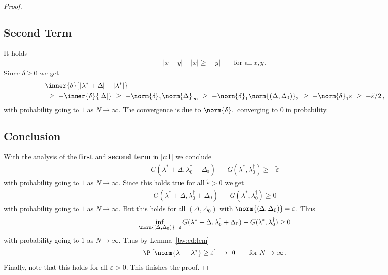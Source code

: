 \begin{proof}
\subsection*{Second Term}
It holds
\begin{gather*}
  |x+y|-|x|\ge
  -|y|
  \qquad
  \text{for all}\ 
  x,y
  \,.
\end{gather*}
Since
$\delta\ge 0$
we get
\begin{align*}
  &
     \inner
     {\delta}
     {
       |\lambda^*+\Delta|
       -
       |\lambda^*|
     }
     \\
     &
     \ 
     \ge
     \ 
     -
     \inner{\delta}
     {|\Delta|}
     \ 
     \ge
     \ 
     -
     \norm{\delta}_1
     \norm{\Delta}_\infty
     \ 
     \ge
     \ 
     -
     \norm{\delta}_1
     \norm{(\Delta,\Delta_0)}_2
     \ 
     \ge
     \ 
     -
     \norm{\delta}_1
     \varepsilon
     \ 
     \ge
     \ 
     -
     \tilde{\varepsilon}/2
     \,,
\end{align*}
with probability going to $1$ as $N\to \infty$.
The convergence is due to $\norm{\delta}_1$ converging to $0$ in probability.
\subsection*{Conclusion}
With the analysis of the \textbf{first} and \textbf{second term} in
\eqref{c:1} we conclude
\begin{gather}
  G
     (
     \lambda^*
      +
      \Delta
      ,
      \lambda^\dagger_0
      +
     \Delta_0
     )
     \ 
     -
     \ 
     G
     (
     \lambda^*,
      \lambda^\dagger_0
     )
     \ge
     -
     \tilde{\varepsilon}
\end{gather}
with probability going to $1$ as $N\to \infty$.
Since this holds true for all $\tilde{\varepsilon}>0$ we get
\begin{gather}
  G
     (
     \lambda^*
      +
      \Delta
      ,
      \lambda^\dagger_0
      +
     \Delta_0
     )
     \ 
     -
     \ 
     G
     (
     \lambda^*,
      \lambda^\dagger_0
     )
     \ge
     0
\end{gather}
with probability going to $1$ as $N\to \infty$.
But this holds for all 
$
(\Delta,\Delta_0)
$
with 
$
\norm{
(\Delta,\Delta_0)
}
=\varepsilon
$. Thus
\begin{gather}
   \inf _ { 
       \norm{
         (
     \Delta
     ,
     \Delta_0
         )
 } 
= \varepsilon }
     G
     (
     \lambda^*
      +
      \Delta
      ,
      \lambda^\dagger_0
      +
     \Delta_0
     )
     -
     G
     (
     \lambda^*,
      \lambda^\dagger_0
     )
     \ge 
     0
\end{gather}
with probability going to $1$ as $N\to \infty$.
Thus by Lemma~\ref{bw:cd:lem}
\begin{gather}
  \P
    \left[ 
    \norm{
      \lambda^\dagger
      -
      \lambda^*
    }
    \ge
    \varepsilon
    \right]
    \ 
    \to
    \ 
    0
    \qquad
    \text{for}\ 
    N
    \to 
    \infty
    \,.
\end{gather}
Finally, note that this holds for all $\varepsilon>0$. This finishes the proof.
\end{proof}
